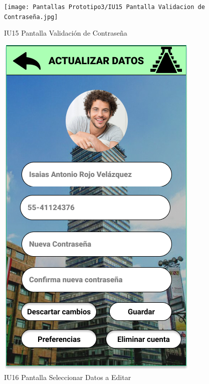 \begin{figure}[h]
    \begin{minipage}{0.5\textwidth}
        \centering
        \texttt{[image: Pantallas Prototipo3/IU15 Pantalla Validacion de Contraseña.jpg]}
        \caption{IU15 Pantalla Validación de Contraseña}
    \end{minipage}
    
    \begin{minipage}{0.5\textwidth}
        \centering
        \includegraphics[width=.7\linewidth]{Pantallas Prototipo3/IU16 Pantalla de seleccionar el dato a editar.jpg}
        \caption{IU16 Pantalla Seleccionar Datos a Editar}
    \end{minipage}%
\end{figure}

